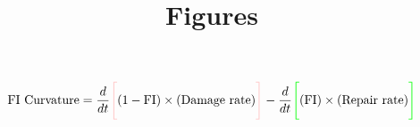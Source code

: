 \documentclass{revtex4-1}
\title{Figures}
\begin{document}
\begin{eqnarray}
  \mathrm{FI\,\,Curvature} = \frac{d}{dt}{\color{pink}\Bigg[ }(1-\mathrm{FI})\times(\mathrm{Damage\,\,rate}){\color{pink}\Bigg] } -\frac{d}{dt}{\color{green}\Bigg[ }(\mathrm{FI})\times(\mathrm{Repair\,\,rate}){\color{green}\Bigg] }
  \end{eqnarray}
\end{document}
